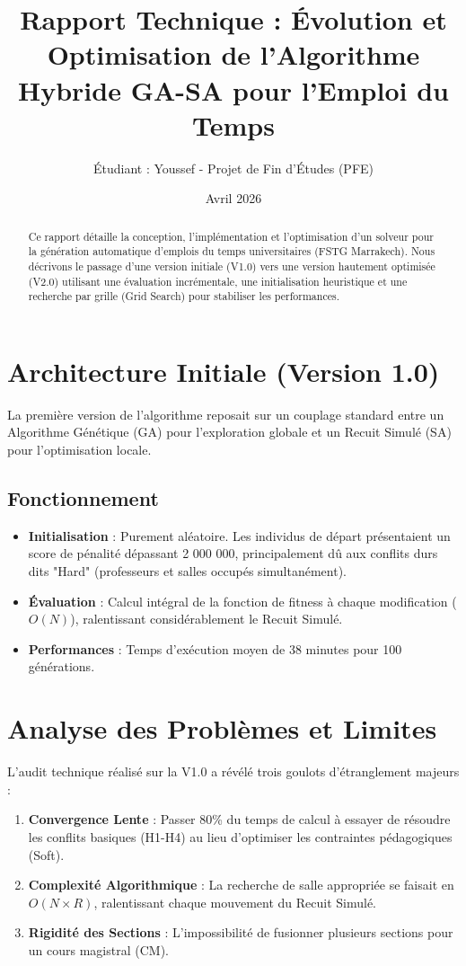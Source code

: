 \documentclass{article}
\title{Rapport Technique : Évolution et Optimisation de l'Algorithme Hybride GA-SA pour l'Emploi du Temps}
\author{Étudiant : Youssef - Projet de Fin d'Études (PFE)}
\date{Avril 2026}
\begin{document}
\maketitle

\begin{abstract}
Ce rapport détaille la conception, l'implémentation et l'optimisation d'un solveur pour la génération automatique d'emplois du temps universitaires (FSTG Marrakech). Nous décrivons le passage d'une version initiale (V1.0) vers une version hautement optimisée (V2.0) utilisant une évaluation incrémentale, une initialisation heuristique et une recherche par grille (Grid Search) pour stabiliser les performances.
\end{abstract}

\section{Architecture Initiale (Version 1.0)}
La première version de l'algorithme reposait sur un couplage standard entre un Algorithme Génétique (GA) pour l'exploration globale et un Recuit Simulé (SA) pour l'optimisation locale.

\subsection{Fonctionnement}
\begin{itemize}
    \item \textbf{Initialisation} : Purement aléatoire. Les individus de départ présentaient un score de pénalité dépassant 2 000 000, principalement dû aux conflits durs dits "Hard" (professeurs et salles occupés simultanément).
    \item \textbf{Évaluation} : Calcul intégral de la fonction de fitness à chaque modification ($O(N)$), ralentissant considérablement le Recuit Simulé.
    \item \textbf{Performances} : Temps d'exécution moyen de 38 minutes pour 100 générations.
\end{itemize}

\section{Analyse des Problèmes et Limites}
L'audit technique réalisé sur la V1.0 a révélé trois goulots d'étranglement majeurs :
\begin{enumerate}
    \item \textbf{Convergence Lente} : Passer 80\% du temps de calcul à essayer de résoudre les conflits basiques (H1-H4) au lieu d'optimiser les contraintes pédagogiques (Soft).
    \item \textbf{Complexité Algorithmique} : La recherche de salle appropriée se faisait en $O(N \times R)$, ralentissant chaque mouvement du Recuit Simulé.
    \item \textbf{Rigidité des Sections} : L'impossibilité de fusionner plusieurs sections pour un cours magistral (CM).
\end{enumerate}
\end{document}
